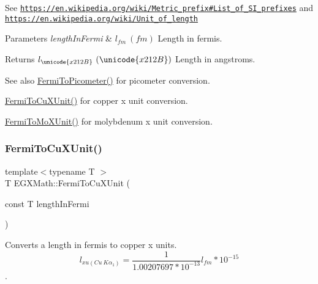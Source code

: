 See \href{https://en.wikipedia.org/wiki/Metric_prefix#List_of_SI_prefixes}{\tt https\+://en.\+wikipedia.\+org/wiki/\+Metric\+\_\+prefix\#\+List\+\_\+of\+\_\+\+S\+I\+\_\+prefixes} and \href{https://en.wikipedia.org/wiki/Unit_of_length}{\tt https\+://en.\+wikipedia.\+org/wiki/\+Unit\+\_\+of\+\_\+length} 
\begin{DoxyParams}{Parameters}
{\em length\+In\+Fermi} & $ l_{fm}\ (fm)$ Length in fermis. \\
\hline
\end{DoxyParams}
\begin{DoxyReturn}{Returns}
$ l_{\unicode{x212B}}\ (\unicode{x212B})$ Length in angstroms. 
\end{DoxyReturn}
\begin{DoxySeeAlso}{See also}
\mbox{\hyperlink{group___e_g_x_math-_conversions-_length_conversions-_non-_s_i-_fermi-_s_i_ga9d12cf46e802908b3ee6f6e1c4d8047e}{Fermi\+To\+Picometer()}} for picometer conversion. 

\mbox{\hyperlink{group___e_g_x_math-_conversions-_length_conversions-_non-_s_i-_fermi-_non-_s_i_ga8c0963430e8fec7c613543844bd80064}{Fermi\+To\+Cu\+X\+Unit()}} for copper x unit conversion. 

\mbox{\hyperlink{group___e_g_x_math-_conversions-_length_conversions-_non-_s_i-_fermi-_non-_s_i_ga8555a46e14c4a759e0b04a54485d679e}{Fermi\+To\+Mo\+X\+Unit()}} for molybdenum x unit conversion. 
\end{DoxySeeAlso}
\mbox{\label{group___e_g_x_math-_conversions-_length_conversions-_non-_s_i-_fermi-_non-_s_i_ga8c0963430e8fec7c613543844bd80064}} 
\subsubsection{\texorpdfstring{Fermi\+To\+Cu\+X\+Unit()}{FermiToCuXUnit()}}
{\footnotesize\ttfamily template$<$typename T $>$ \\
T E\+G\+X\+Math\+::\+Fermi\+To\+Cu\+X\+Unit (\begin{DoxyParamCaption}\item[{const T}]{length\+In\+Fermi }\end{DoxyParamCaption})}



Converts a length in fermis to copper x units. \[ l_{xu(Cu\ K\alpha_1)}= \frac{1}{1.00207697*10^{-13}} l_{fm} * 10^{-15}\]. 


